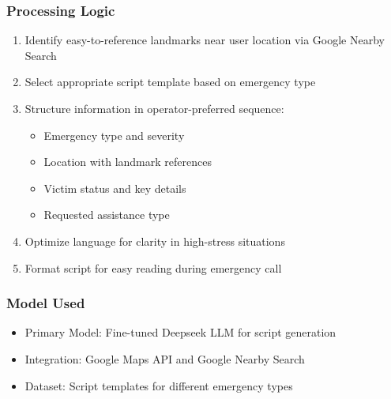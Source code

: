 \subsubsection{Processing Logic}
\begin{enumerate}
    \item Identify easy-to-reference landmarks near user location via Google Nearby Search
    \item Select appropriate script template based on emergency type
    \item Structure information in operator-preferred sequence:
    \begin{itemize}
        \item Emergency type and severity
        \item Location with landmark references
        \item Victim status and key details
        \item Requested assistance type
    \end{itemize}
    \item Optimize language for clarity in high-stress situations
    \item Format script for easy reading during emergency call
\end{enumerate}

\subsubsection{Model Used}
\begin{itemize}
    \item Primary Model: Fine-tuned Deepseek LLM for script generation
    \item Integration: Google Maps API and Google Nearby Search
    \item Dataset: Script templates for different emergency types
\end{itemize}